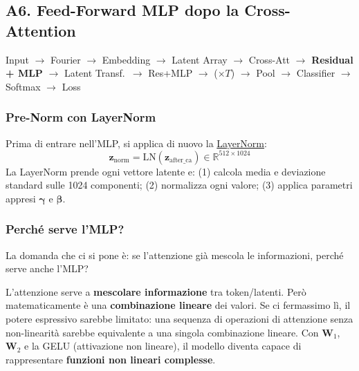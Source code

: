 \documentclass[12pt,a4paper]{article}
\begin{document}
\subsection{A6. Feed-Forward MLP dopo la Cross-Attention} \label{sec:mlp_forward}

\begin{pipelinebox}
Input $\to$ Fourier $\to$ Embedding $\to$ Latent Array $\to$ Cross-Att $\to$ \textbf{Residual + MLP} $\to$ Latent Transf.\ $\to$ Res+MLP $\to$ ($\times T$) $\to$ Pool $\to$ Classifier $\to$ Softmax $\to$ Loss
\end{pipelinebox}

\subsubsection{Pre-Norm con LayerNorm}

Prima di entrare nell'MLP, si applica di nuovo la \hyperref[sec:layernorm]{LayerNorm}:
\[
    \mathbf{z}_{\text{norm}} = \text{LN}(\mathbf{z}_{\text{after\_ca}}) \in \mathbb{R}^{512 \times 1024}
\]
La LayerNorm prende ogni vettore latente e: (1) calcola media e deviazione standard sulle 1024 componenti; (2) normalizza ogni valore; (3) applica parametri appresi $\boldsymbol{\gamma}$ e $\boldsymbol{\beta}$.

\subsubsection{Perch\'e serve l'MLP?}

La domanda che ci si pone \`e: se l'attenzione gi\`a mescola le informazioni, perch\'e serve anche l'MLP?

L'attenzione serve a \textbf{mescolare informazione} tra token/latenti. Per\`o matematicamente \`e una \textbf{combinazione lineare} dei valori. Se ci fermassimo l\`i, il potere espressivo sarebbe limitato: una sequenza di operazioni di attenzione senza non-linearit\`a sarebbe equivalente a una singola combinazione lineare. Con $\mathbf{W}_1$, $\mathbf{W}_2$ e la GELU (attivazione non lineare), il modello diventa capace di rappresentare \textbf{funzioni non lineari complesse}.
\end{document}
